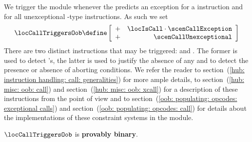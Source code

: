 We trigger the \oobMod{} module whenever the \zkEvm{} predicts an exception for a  instruction and for all unexceptional -type instructions.
As such we set
\[
	\locCallTriggersOob
	\define
	\left[ \begin{array}{cr}
		+ & \locIsCall \cdot \scenCallException \\
		+ & \scenCallUnexceptional              \\
	\end{array} \right]
\]
\saNote{}
There are two distinct \oobMod{} instructions that may be triggered: \oobInstXcall{} and \oobInstCall{}.
The former is used to detect \staticxSH{}'s, the latter is used to justify the absence of any \staticxSH{} and to detect the presence or absence of aborting conditions.
We refer the reader to section~(\ref{hub: instruction handling: call: generalities}) for more ample details, to
section~(\ref{hub: misc: oob: call})  and
section~(\ref{hub: misc: oob: xcall}) for a description of these instructions from the \hubMod{} point of view and to
section~(\ref{oob: populating: opcodes: exceptional calls}) and
section~(\ref{oob: populating: opcodes: call})
for details about the implementations of these constraint systems in the \oobMod{} module.

\saNote{}
$\locCallTriggersOob$ is \textbf{provably binary}.
